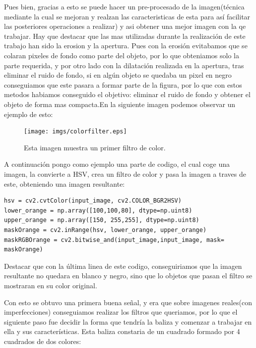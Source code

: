 \hspace{1cm} Pues bien, gracias a esto se puede hacer un pre-procesado de la imagen(t\'ecnica mediante la cual se mejoran y realzan las caracteristicas de esta para as\'i facilitar las posteriores operaciones a realizar) y asi obtener una mejor imagen con la qe trabajar. Hay que destacar que las mas utilizadas durante la realizaci\'on de este trabajo han sido la erosion y la apertura. Pues con la erosi\'on evitabamos que se colaran pixeles de fondo como parte del objeto, por lo que obteniamos solo la parte requerida, y por otro lado con la dilataci\'on realizada en la apertura, tras eliminar el ruido de fondo, si en alg\'un objeto se quedaba un pixel en negro conseguiamos que este pasara a formar parte de la figura, por lo que con estos metodos habiamos conseguido el objetivo: eliminar el ruido de fondo y obtener el objeto de forma mas compacta.En la siguiente imagen podemos observar un ejemplo de esto:

\begin{figure}[ht]
	\centering
		\texttt{[image: imgs/colorfilter.eps]}
		\caption{Esta imagen muestra un primer filtro de color.}
	\label{fig:ColorFilter}
\end{figure}

\hspace{1cm} A continuaci\'on pongo como ejemplo una parte de codigo, el cual coge una imagen, la convierte a HSV, crea un filtro de color y pasa la imagen a traves de este, obteniendo una imagen resultante:
\begin{verbatim}
hsv = cv2.cvtColor(input_image, cv2.COLOR_BGR2HSV)
lower_orange = np.array([100,100,80], dtype=np.uint8)
upper_orange = np.array([150, 255,255], dtype=np.uint8)
maskOrange = cv2.inRange(hsv, lower_orange, upper_orange)
maskRGBOrange = cv2.bitwise_and(input_image,input_image, mask= maskOrange)
\end{verbatim}
\hspace{1 cm} Destacar que con la \'ultima linea de este codigo, conseguiriamos que la imagen resultante no quedara en blanco y negro, sino que lo objetos que pasan el filtro se mostraran en su color original. 

\hspace{1 cm} Con esto se obtuvo una primera buena señal, y era que sobre imagenes reales(con imperfecciones) conseguiamos realizar los filtros que queriamos, por lo que el siguiente paso fue decidir la forma que tendr\'ia la baliza y comenzar a trabajar en ella y sus caracter\'isticas. Esta baliza constaria de un cuadrado formado por 4 cuadrados de dos colores: 

